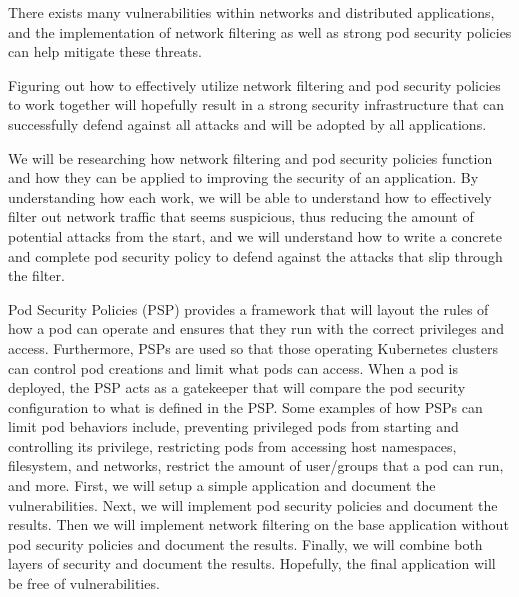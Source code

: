 There exists many vulnerabilities within networks and distributed 
applications, and the implementation of network filtering
as well as strong pod security policies can help mitigate
these threats.

Figuring out how to effectively utilize network filtering and
pod security policies to work together will hopefully result
in a strong security infrastructure that can successfully
defend against all attacks and will be adopted by all applications.

We will be researching how network filtering and pod security policies
function and how they can be applied to improving the security of
an application. By understanding how each work, we will be able to
understand how to effectively filter out network traffic that seems
suspicious, thus reducing the amount of potential attacks from the
start, and we will understand how to write a concrete and complete
pod security policy to defend against the attacks that slip through
the filter.

Pod Security Policies (PSP) provides a framework that will layout the rules
of how a pod can operate and ensures that they run with the correct
privileges and access. Furthermore, PSPs are used so that those operating
Kubernetes clusters can control pod creations and limit what pods can access.
When a pod is deployed, the PSP acts as a gatekeeper that will compare the
pod security configuration to what is defined in the PSP. Some examples of how
PSPs can limit pod behaviors include, preventing privileged pods from starting
and controlling its privilege, restricting pods from accessing host namespaces,
filesystem, and networks, restrict the amount of user/groups that a pod can run,
and more.
First, we will setup a simple application and document the vulnerabilities.
Next, we will implement pod security policies and document the results.
Then we will implement network filtering on the base application without pod security policies
and document the results. Finally, we will combine both layers of security and document the results.
Hopefully, the final application will be free of vulnerabilities.

